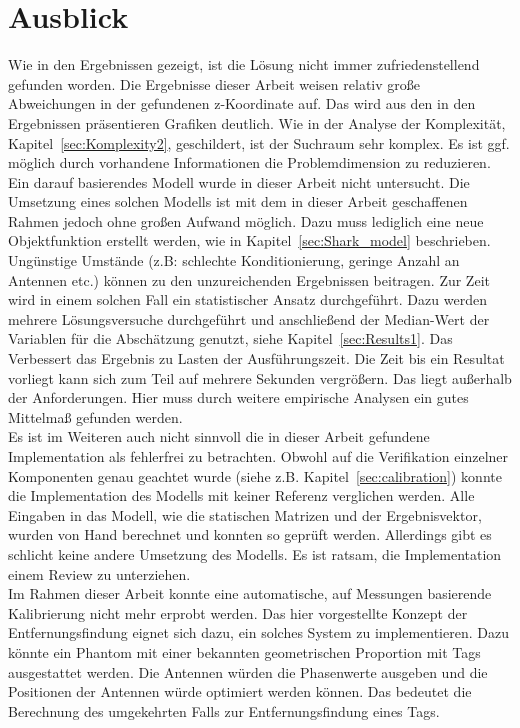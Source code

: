 %
\section{Ausblick}
\label{sec:Calibration_Optimaztion}
%
Wie in den Ergebnissen gezeigt, ist die Lösung nicht immer zufriedenstellend gefunden worden. Die Ergebnisse dieser Arbeit weisen relativ große Abweichungen in der gefundenen z-Koordinate auf. Das wird aus den in den Ergebnissen präsentieren Grafiken deutlich. Wie in der Analyse der Komplexität, Kapitel~\ref{sec:Komplexity2}, geschildert, ist der Suchraum sehr komplex. Es ist ggf. möglich durch vorhandene Informationen die Problemdimension zu reduzieren. Ein darauf basierendes Modell wurde in dieser Arbeit nicht untersucht. Die Umsetzung eines solchen Modells ist mit dem in dieser Arbeit geschaffenen Rahmen jedoch ohne großen Aufwand möglich. Dazu muss lediglich eine neue Objektfunktion erstellt werden, wie in Kapitel~\ref{sec:Shark_model} beschrieben.\\

Ungünstige Umstände (z.B: schlechte Konditionierung, geringe Anzahl an Antennen etc.) können zu den unzureichenden Ergebnissen beitragen. Zur Zeit wird in einem solchen Fall ein statistischer Ansatz durchgeführt. Dazu werden mehrere Lösungsversuche durchgeführt und anschließend der Median-Wert der Variablen für die Abschätzung genutzt, siehe Kapitel~\ref{sec:Results1}. Das Verbessert das Ergebnis zu Lasten der Ausführungszeit. Die Zeit bis ein Resultat vorliegt kann sich zum Teil auf mehrere Sekunden vergrößern. Das liegt außerhalb der Anforderungen. Hier muss durch weitere empirische Analysen ein gutes Mittelmaß gefunden werden.\\
%

Es ist im Weiteren auch nicht sinnvoll die in dieser Arbeit gefundene Implementation als fehlerfrei zu betrachten. Obwohl auf die Verifikation einzelner Komponenten genau geachtet wurde (siehe z.B. Kapitel~\ref{sec:calibration}) konnte die Implementation des Modells mit keiner Referenz verglichen werden. Alle Eingaben in das Modell, wie die statischen Matrizen und der Ergebnisvektor, wurden von Hand berechnet und konnten so geprüft werden. Allerdings gibt es schlicht keine andere Umsetzung des Modells. Es ist ratsam, die Implementation einem Review zu unterziehen.\\
%

Im Rahmen dieser Arbeit konnte eine automatische, auf Messungen basierende Kalibrierung nicht mehr erprobt werden. Das hier vorgestellte Konzept der Entfernungsfindung eignet sich dazu, ein solches System zu implementieren. Dazu könnte ein Phantom mit einer bekannten geometrischen Proportion mit Tags ausgestattet werden. Die Antennen würden die Phasenwerte ausgeben und die Positionen der Antennen würde optimiert werden können. Das bedeutet die Berechnung des umgekehrten Falls zur Entfernungsfindung eines Tags.\\
%

